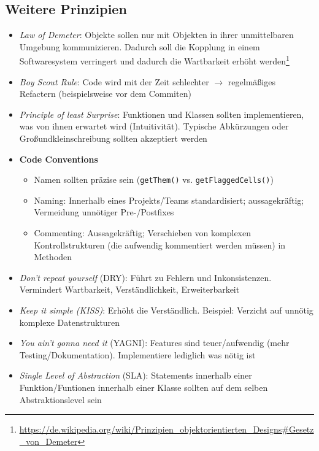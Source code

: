 \subsection{Weitere Prinzipien}
\begin{itemize}
	\item \textit{Law of Demeter}: Objekte sollen nur mit Objekten in ihrer unmittelbaren Umgebung kommunizieren. Dadurch soll die Kopplung in einem Softwaresystem verringert und dadurch die Wartbarkeit erhöht werden\footnote{\url{https://de.wikipedia.org/wiki/Prinzipien_objektorientierten_Designs\#Gesetz_von_Demeter}}
	\item \textit{Boy Scout Rule}: Code wird mit der Zeit schlechter \(\rightarrow\) regelmäßiges Refactern (beispielsweise vor dem Commiten)
	\item \textit{Principle of least Surprise}: Funktionen und Klassen sollten implementieren, was von ihnen erwartet wird (Intuitivität). Typische Abkürzungen oder Großundkleinschreibung sollten akzeptiert werden
	\item \textbf{Code Conventions}
	\begin{itemize}
		\item Namen sollten präzise sein (\texttt{getThem()} vs. \texttt{getFlaggedCells()})
		\item Naming: Innerhalb eines Projekts/Teams standardisiert; aussagekräftig; Vermeidung unnötiger Pre-/Postfixes
		\item Commenting: Aussagekräftig; Verschieben von komplexen Kontrollstrukturen (die aufwendig kommentiert werden müssen) in Methoden
	\end{itemize}
	\item \textit{Don't repeat yourself} (DRY): Führt zu Fehlern und Inkonsistenzen. Vermindert Wartbarkeit, Verständlichkeit, Erweiterbarkeit
	\item \textit{Keep it simple (KISS)}: Erhöht die Verständlich. Beispiel: Verzicht auf unnötig komplexe Datenstrukturen
	\item \textit{You ain't gonna need it} (YAGNI): Features sind teuer/aufwendig (mehr Testing/Dokumentation). Implementiere lediglich was nötig ist
	\item \textit{Single Level of Abstraction} (SLA): Statements innerhalb einer Funktion/Funtionen innerhalb einer Klasse sollten auf dem selben Abstraktionslevel sein
\end{itemize}


